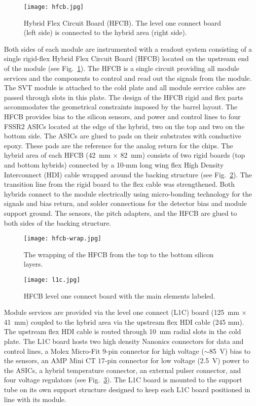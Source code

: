 \begin{figure}[h] 
\centering 
\texttt{[image: hfcb.jpg]}
\caption{Hybrid Flex Circuit Board (HFCB). The level one connect board (left side) is connected to the hybrid area
  (right side).}
\label{fig:HFCB}
\end{figure}

Both sides of each module are instrumented with a readout system consisting of a single rigid-flex Hybrid Flex
Circuit Board (HFCB) located on the upstream end of the module (see Fig.~\ref{fig:HFCB}). The HFCB is a single
circuit providing all module services and the components to control and read out the signals from the module. The
SVT module is attached to the cold plate and all module service cables are passed through slots in this plate. The
design of the HFCB rigid and flex parts accommodates the geometrical constraints imposed by the barrel layout.
The HFCB provides bias to the silicon sensors, and power and control lines to four FSSR2 ASICs located at the edge
of the hybrid, two on the top and two on the bottom side. The ASICs are glued to pads on their substrates with
conductive epoxy. These pads are the reference for the analog return for the chips. The hybrid area of each HFCB
(42~mm $\times$ 82~mm) consists of two rigid boards (top and bottom hybrids) connected by a 10-mm long wing
flex High Density Interconnect (HDI) cable wrapped around the backing structure (see Fig.~\ref{fig:hfcb-wrap}).
The transition line from the rigid board to the flex cable was strengthened. Both hybrids connect to the module
electrically using micro-bonding technology for the signals and bias return, and solder connections for the detector
bias and module support ground. The sensors, the pitch adapters, and the HFCB are glued to both sides of the
backing structure. 

\begin{figure}[h] 
\centering 
\texttt{[image: hfcb-wrap.jpg]}
\caption{The wrapping of the HFCB from the top to the bottom silicon layers.}
\label{fig:hfcb-wrap}
\end{figure}

\begin{figure}[h] 
\centering 
\texttt{[image: l1c.jpg]}
\caption{HFCB level one connect board with the main elements labeled.}
\label{fig:l1c}
\end{figure}

Module services are provided via the level one connect (L1C) board (125~mm $\times$ 41~mm) coupled to the hybrid
area via the upstream flex HDI cable (245 mm). The upstream flex HDI cable is routed through 10~mm radial slots
in the cold plate. The L1C board hosts two high density Nanonics connectors for data and control lines, a Molex
Micro-Fit 9-pin connector for high voltage ($\sim$85~V) bias to the sensors, an AMP Mini CT 17-pin connector for
low voltage (2.5~V) power to the ASICs, a hybrid temperature connector, an external pulser connector, and four
voltage regulators (see Fig.~\ref{fig:l1c}). The L1C board is mounted to the support tube on its own support structure
designed to keep each L1C board positioned in line with its module.


